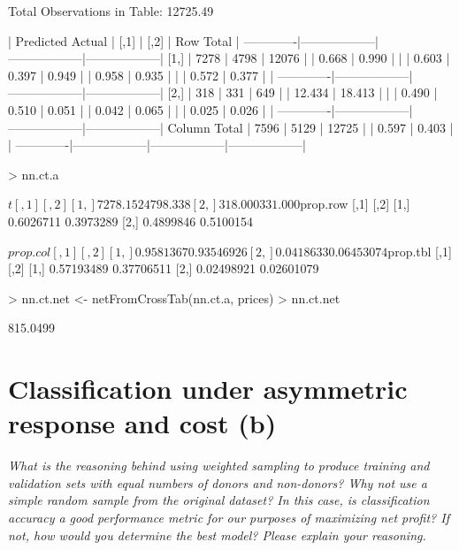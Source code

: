 \documentclass{article}
\begin{document}
\begin{Schunk}
\begin{Soutput}
 
Total Observations in Table:  12725.49 

 
             | Predicted 
      Actual |             [,1] |             [,2] |        Row Total | 
-------------|------------------|------------------|------------------|
        [1,] |             7278 |             4798 |            12076 | 
             |            0.668 |            0.990 |                  | 
             |            0.603 |            0.397 |            0.949 | 
             |            0.958 |            0.935 |                  | 
             |            0.572 |            0.377 |                  | 
-------------|------------------|------------------|------------------|
        [2,] |              318 |              331 |              649 | 
             |           12.434 |           18.413 |                  | 
             |            0.490 |            0.510 |            0.051 | 
             |            0.042 |            0.065 |                  | 
             |            0.025 |            0.026 |                  | 
-------------|------------------|------------------|------------------|
Column Total |             7596 |             5129 |            12725 | 
             |            0.597 |            0.403 |                  | 
-------------|------------------|------------------|------------------|
\end{Soutput}
\begin{Sinput}
> nn.ct.a
\end{Sinput}
\begin{Soutput}
$t
         [,1]     [,2]
[1,] 7278.152 4798.338
[2,]  318.000  331.000

$prop.row
          [,1]      [,2]
[1,] 0.6026711 0.3973289
[2,] 0.4899846 0.5100154

$prop.col
          [,1]       [,2]
[1,] 0.9581367 0.93546926
[2,] 0.0418633 0.06453074

$prop.tbl
           [,1]       [,2]
[1,] 0.57193489 0.37706511
[2,] 0.02498921 0.02601079
\end{Soutput}
\begin{Sinput}
> nn.ct.net <- netFromCrossTab(nn.ct.a, prices)
> nn.ct.net
\end{Sinput}
\begin{Soutput}
[1] 815.0499
\end{Soutput}
\end{Schunk}

\section*{Classification under asymmetric response and cost (b)}
{\it
What is the reasoning behind using weighted sampling to produce training and validation sets with equal numbers of donors and non-donors? Why not use a simple random sample from the original dataset? In this case, is classification accuracy a good performance metric for our purposes of maximizing net profit? If not, how would you determine the best model? Please explain your reasoning.}
\end{document}
